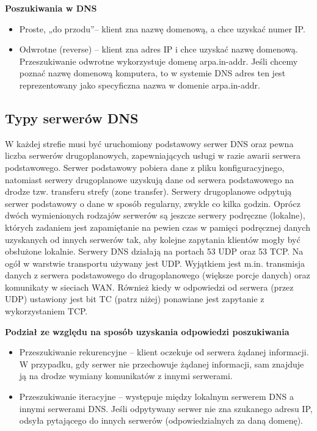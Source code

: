 \documentclass[../main.tex]{subfiles}
\begin{document}
        \textbf{Poszukiwania w DNS}
        \begin{itemize}
            \item Proste, „do przodu”– klient zna nazwę domenową, a chce uzyskać numer IP.
            \item Odwrotne (reverse) – klient zna adres IP i chce uzyskać nazwę domenową.
            Przeszukiwanie odwrotne wykorzystuje domenę arpa.in-addr. Jeśli chcemy
            poznać nazwę domenową komputera, to w systemie DNS adres ten
            jest reprezentowany jako specyficzna nazwa w domenie arpa.in-addr.
        \end{itemize}

        \subsection{Typy serwerów DNS}
        W każdej strefie musi być uruchomiony podstawowy serwer DNS oraz pewna liczba
        serwerów drugoplanowych, zapewniających usługi w razie awarii serwera podstawowego.
        Serwer podstawowy pobiera dane z pliku konfiguracyjnego, natomiast serwery
        drugoplanowe uzyskują dane od serwera podstawowego na drodze tzw. transferu strefy
        (zone transfer). Serwery drugoplanowe odpytują serwer podstawowy o dane w sposób
        regularny, zwykle co kilka godzin. Oprócz dwóch wymienionych rodzajów serwerów są
        jeszcze serwery podręczne (lokalne), których zadaniem jest zapamiętanie na pewien czas w
        pamięci podręcznej danych uzyskanych od innych serwerów tak, aby kolejne zapytania
        klientów mogły być obsłużone lokalnie.
        Serwery DNS działają na portach 53 UDP oraz 53 TCP. Na ogół w warstwie transportu
        używany jest UDP. Wyjątkiem jest m.in. transmisja danych z serwera podstawowego do
        drugoplanowego (większe porcje danych) oraz komunikaty w sieciach WAN. Również kiedy w
        odpowiedzi od serwera (przez UDP) ustawiony jest bit TC (patrz niżej) ponawiane jest
        zapytanie z wykorzystaniem TCP.

        \textbf{Podział ze względu na sposób uzyskania odpowiedzi poszukiwania}
        \begin{itemize}
            \item Przeszukiwanie rekurencyjne – klient oczekuje od serwera żądanej informacji. W przypadku,
            gdy serwer nie przechowuje żądanej informacji, sam znajduje ją na drodze wymiany
            komunikatów z innymi serwerami.
            \item  Przeszukiwanie iteracyjne – występuje między lokalnym serwerem DNS a innymi serwerami
            DNS. Jeśli odpytywany serwer nie zna szukanego adresu IP, odsyła pytającego do innych
            serwerów (odpowiedzialnych za daną domenę).
        \end{itemize}
\end{document}
